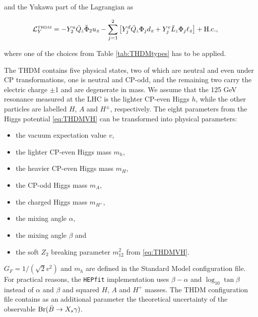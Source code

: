 \documentclass[aps,superscriptaddress,nofootinbib,floatfix,notitlepage]{revtex4-1}
\newcommand{\HEPfit}{\texttt{HEPfit}\xspace}
\begin{document}
and the Yukawa part of the Lagrangian as
 
\begin{align}
{\cal L}_Y^\text{\tiny{THDM}} &= -Y^u_2 \bar Q_{\textit{\tiny{L}}} \tilde\Phi_2 u_{\textit{\tiny{R}}} -\sum\limits_{j=1}^2 \left[ Y^d_j \bar Q_{\textit{\tiny{L}}} \Phi_j d_{\textit{\tiny{R}}} +Y^e_j \bar L_{\textit{\tiny{L}}} \Phi_j \ell_{\textit{\tiny{R}}}\right] + {\text{H.c.}} \nonumber ,
\end{align}
 
where one of the choices from Table \ref{tab:THDMtypes} has to be applied.

The THDM contains five physical states, two of which are neutral and even under CP transformations, one is neutral and CP-odd, and the remaining two carry the electric charge $\pm$1 and are degenerate in mass. We assume that the 125 GeV resonance measured at the LHC is the lighter CP-even Higgs $h$, while the other particles are labelled $H$, $A$ and $H^\pm$, respectively.
The eight parameters from the Higgs potential \eqref{eq:THDMVH} can be transformed into physical parameters:

\begin{itemize}
\item the vacuum expectation value $v$,
\item the lighter CP-even Higgs mass $m_h$,
\item the heavier CP-even Higgs mass $m_H$,
\item the CP-odd Higgs mass $m_A$,
\item the charged Higgs mass $m_{H^+}$,
\item the mixing angle $\alpha$,
\item the mixing angle $\beta$ and
\item the soft $Z_2$ breaking parameter $m_{12}^2$ from \eqref{eq:THDMVH}.
\end{itemize}

$G_F=1/(\sqrt{2} v^2)$ and $m_h$ are defined in the Standard Model configuration file. For practical reasons, the \HEPfit implementation uses $\beta-\alpha$ and $\log_{10}\tan\beta$ instead of $\alpha$ and $\beta$ and squared $H$, $A$ and $H^+$ masses. The THDM configuration file contains as an additional parameter the theoretical uncertainty of the observable ${\rm Br}(\bar{B}\to X_s\gamma)$.
\end{document}
